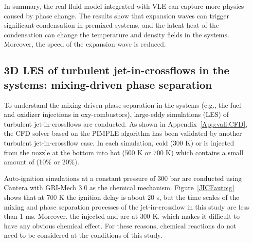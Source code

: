 In summary, the real fluid model integrated with VLE can capture more physics caused by phase change. %
The results show that expansion waves can trigger significant condensation in premixed  systems, and the latent heat of the condensation can change the temperature and density fields in the systems. Moreover, the speed of the expansion wave is reduced.

\subsection{3D LES of turbulent jet-in-crossflows in the  systems: mixing-driven phase separation}
\label{sec:results:JICF}
To understand the mixing-driven phase separation in the  systems (e.g., the fuel and oxidizer injections in  oxy-combustors), large-eddy simulations (LES) of turbulent jet-in-crossflows are conducted. As shown in Appendix~\ref{App:vali:CFD}, the CFD solver based on the PIMPLE algorithm has been validated by another turbulent jet-in-crossflow case. %
In each simulation, cold (300 K)  or  is injected from the nozzle at the bottom into hot (500 K or 700 K)  which contains a small amount of  (10\% or 20\%). %

Auto-ignition simulations at a constant pressure of 300 bar are conducted using Cantera \cite{goodwin2009cantera} with GRI-Mech 3.0 \cite{smith1999gri} as the chemical mechanism. Figure~\ref{JICFautoig} shows that at 700 K the ignition delay is about 20 s, but the time scales of the mixing and phase separation processes of the jet-in-crossflow in this study are less than 1 ms. Moreover, the injected  and  are at 300 K, which makes it difficult to have any obvious chemical effect. For these reasons, chemical reactions do not need to be considered at the conditions of this study.

